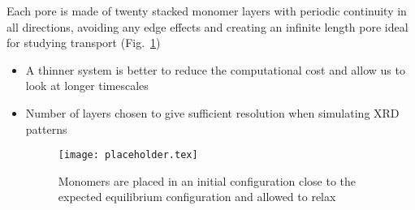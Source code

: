 \documentclass{article}
\begin{document}
\begin{itemize}
	Each pore is made of twenty stacked monomer layers with periodic continuity in all directions, avoiding any edge effects and creating an infinite length pore ideal for studying transport (Fig.~\ref{fig:initial})
	\begin{itemize}
		\item A thinner system is better to reduce the computational cost and allow us to look at longer timescales
		\item Number of layers chosen to give sufficient resolution when simulating XRD patterns
	\begin{figure}
	\texttt{[image: placeholder.tex]}
		\caption{Monomers are placed in an initial configuration close to the expected equilibrium configuration and allowed to relax}
		\label{fig:initial}
	\end{figure}


\end{itemize}
\end{itemize}
\end{document}
